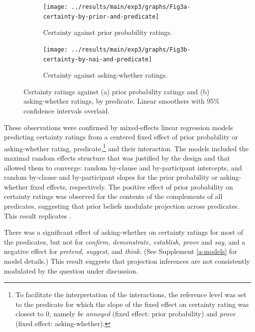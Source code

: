 \documentclass[11pt,fleqn]{article}
\newcommand{\6}{\mbox{$[\hspace*{-.6mm}[$}}
\newcommand{\9}{\mbox{$]\hspace*{-.6mm}]$}}
\begin{document}
\begin{figure}[h!]
\centering
\begin{subfigure}[t]{0.5\textwidth}
\par\bigskip
\centering
\texttt{[image: ../results/main/exp3/graphs/Fig3a-certainty-by-prior-and-predicate]}
\caption{Certainty against prior probability ratings.}\label{fig:certainty-by-prior-and-predicate}
\end{subfigure}%
\begin{subfigure}[t]{0.5\textwidth}
\par\bigskip
\centering
\texttt{[image: ../results/main/exp3/graphs/Fig3b-certainty-by-nai-and-predicate]}
\caption{Certainty against asking-whether ratings.}\label{fig:certainty-by-nai-and-predicate}
 \end{subfigure}


\caption{Certainty ratings against (a) prior probability ratings and (b) asking-whether ratings, by predicate. Linear smoothers with 95\% confidence intervals overlaid.}\label{fig:results2}
\end{figure}


These observations were confirmed by mixed-effects linear regression models predicting certainty ratings from a centered fixed effect of prior probability or asking-whether rating, predicate,\footnote{To facilitate the interpretation of the interactions, the reference level was set to the predicate for which the slope of the fixed effect on certainty rating was closest to 0, namely {\em be annoyed} (fixed effect: prior probability) and {\em prove} (fixed effect: asking-whether).} and their interaction. The models included the maximal random effects structure that was justified by the design and that allowed them to converge: random by-clause and by-participant intercepts, and random by-clause and by-participant slopes for the prior probability or asking-whether fixed effects, respectively. The positive effect of prior probability on certainty ratings was observed for the contents of the complements of all predicates, suggesting that prior beliefs modulate projection across predicates. This result replicates \citealt{degen-tonhauser-openmind}. 

There was a significant effect of asking-whether on certainty ratings for most of the predicates, but not for {\em confirm, demonstrate, establish, prove} and {\em say}, and a negative effect for {\em pretend, suggest}, and {\em think}. (See Supplement \ref{a-models} for model details.) This result suggests that projection inferences are not consistently modulated by the question under discussion.
\end{document}
